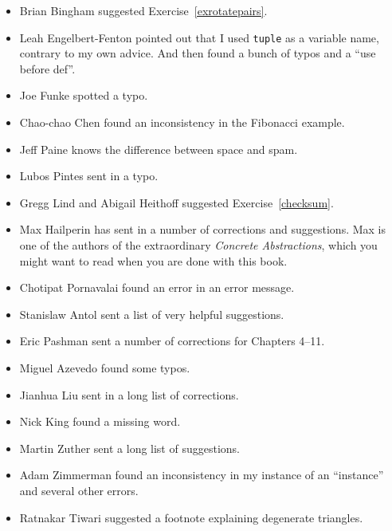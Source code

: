 \begin{itemize}
\item Brian Bingham suggested Exercise~\ref{exrotatepairs}.

\item Leah Engelbert-Fenton pointed out that I used {\tt tuple}
as a variable name, contrary to my own advice.  And then found
a bunch of typos and a ``use before def''.

\item Joe Funke spotted a typo.

\item Chao-chao Chen found an inconsistency in the Fibonacci example.

\item Jeff Paine knows the difference between space and spam.

\item Lubos Pintes sent in a typo.

\item Gregg Lind and Abigail Heithoff suggested Exercise~\ref{checksum}.

\item Max Hailperin has sent in a number of corrections and
  suggestions.  Max is one of the authors of the extraordinary {\em
    Concrete Abstractions}, which you might want to read when you are
  done with this book.

\item Chotipat Pornavalai found an error in an error message.

\item Stanislaw Antol sent a list of very helpful suggestions.

\item Eric Pashman sent a number of corrections for Chapters 4--11.

\item Miguel Azevedo found some typos.

\item Jianhua Liu sent in a long list of corrections.

\item Nick King found a missing word.

\item Martin Zuther sent a long list of suggestions.

\item Adam Zimmerman found an inconsistency in my instance
of an ``instance'' and several other errors.

\item Ratnakar Tiwari suggested a footnote explaining degenerate
triangles.


\end{itemize}
